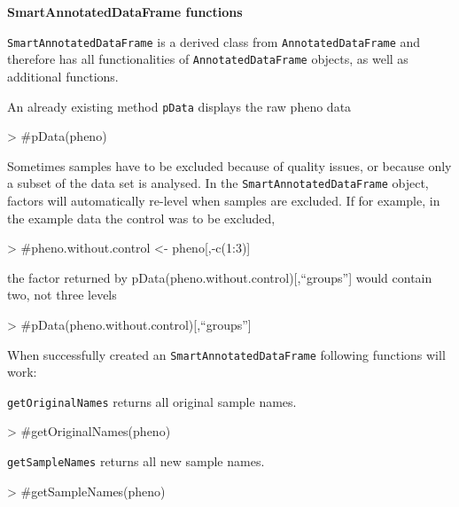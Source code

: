 \documentclass[a4paper,11pt]{article}
\newcommand{\Robject}[1]{{\texttt{#1}}}
\newcommand{\Rfunction}[1]{{\texttt{#1}}}
\begin{document}
\textbf{SmartAnnotatedDataFrame functions}

\Robject{SmartAnnotatedDataFrame} is a derived class from 
\Robject{AnnotatedDataFrame} and therefore has all functionalities
of \Robject{AnnotatedDataFrame} objects, as well as additional functions.

An already existing method \Rfunction{pData} displays the raw pheno data

\begin{Schunk}
\begin{Sinput}
> #pData(pheno)
\end{Sinput}
\end{Schunk}

Sometimes samples have to be excluded because of quality issues, or because only a subset of the data set is analysed. In the \Robject{SmartAnnotatedDataFrame} object, factors will automatically re-level when samples are excluded. If for example, in the example data the control was to be excluded,

\begin{Schunk}
\begin{Sinput}
> #pheno.without.control <- pheno[,-c(1:3)]
\end{Sinput}
\end{Schunk}

the factor returned by pData(pheno.without.control)[,``groups''] would contain two, not three levels

\begin{Schunk}
\begin{Sinput}
> #pData(pheno.without.control)[,``groups'']
\end{Sinput}
\end{Schunk}

When successfully created an \Robject{SmartAnnotatedDataFrame} following functions will work:

\Rfunction{getOriginalNames} returns all original sample names.
\begin{Schunk}
\begin{Sinput}
> #getOriginalNames(pheno)
\end{Sinput}
\end{Schunk}

\Rfunction{getSampleNames} returns all new sample names.
\begin{Schunk}
\begin{Sinput}
> #getSampleNames(pheno) 
\end{Sinput}
\end{Schunk}
\end{document}
